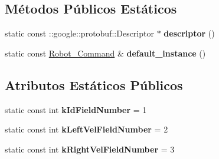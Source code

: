 \subsection*{Métodos Públicos Estáticos}
\begin{DoxyCompactItemize}
\item 
static const \+::google\+::protobuf\+::\+Descriptor $\ast$ {\bfseries descriptor} ()\hypertarget{classvss__command_1_1Robot__Command_ad40c6b295898b078ff34e9966d89b6e5}{}\label{classvss__command_1_1Robot__Command_ad40c6b295898b078ff34e9966d89b6e5}

\item 
static const \hyperlink{classvss__command_1_1Robot__Command}{Robot\+\_\+\+Command} \& {\bfseries default\+\_\+instance} ()\hypertarget{classvss__command_1_1Robot__Command_a4c818a68a4bee11acbc7e7b5483ff4d7}{}\label{classvss__command_1_1Robot__Command_a4c818a68a4bee11acbc7e7b5483ff4d7}

\end{DoxyCompactItemize}
\subsection*{Atributos Estáticos Públicos}
\begin{DoxyCompactItemize}
\item 
static const int {\bfseries k\+Id\+Field\+Number} = 1\hypertarget{classvss__command_1_1Robot__Command_a72d358bc06840eb9b5835ad46cee4620}{}\label{classvss__command_1_1Robot__Command_a72d358bc06840eb9b5835ad46cee4620}

\item 
static const int {\bfseries k\+Left\+Vel\+Field\+Number} = 2\hypertarget{classvss__command_1_1Robot__Command_a834467a27672508216892c745d78bad4}{}\label{classvss__command_1_1Robot__Command_a834467a27672508216892c745d78bad4}

\item 
static const int {\bfseries k\+Right\+Vel\+Field\+Number} = 3\hypertarget{classvss__command_1_1Robot__Command_adb4e9f137218f7bf68ba93029e028e40}{}\label{classvss__command_1_1Robot__Command_adb4e9f137218f7bf68ba93029e028e40}

\end{DoxyCompactItemize}
